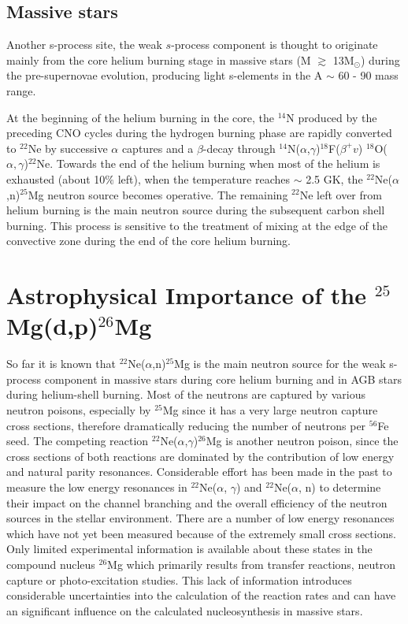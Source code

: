 \subsection{Massive stars}

Another s-process site, the weak $s$-process component is thought to originate mainly from the core helium burning stage in massive stars (M $\gtrsim$ 13M$_\odot$) during the pre-supernovae evolution, producing light s-elements in the A $\sim$ 60 - 90 mass range.

At the beginning of the helium burning in the core, the $^{14}$N produced by the preceding CNO cycles during the hydrogen burning phase are rapidly converted to $^{22}$Ne by successive $\alpha$ captures and a $\beta$-decay through  $^{14}$N($\alpha$,$\gamma$)$^{18}$F($\beta ^{+} v$) $^{18}$O($\alpha,\gamma$)$^{22}$Ne. Towards the end of the helium burning when most of the helium is exhausted (about 10$\%$ left), when the temperature reaches $\sim$ 2.5 GK, the $^{22}$Ne($\alpha$,n)$^{25}$Mg neutron source becomes operative. The remaining $^{22}$Ne left over from helium burning is the main neutron source during the subsequent carbon shell burning. This process is sensitive to the treatment of mixing at the edge of the convective zone during the end of the core helium burning.






\section{Astrophysical Importance of the $^{25}$Mg(d,p)$^{26}$Mg}


So far it is known that $^{22}$Ne($\alpha$,n)$^{25}$Mg is the main neutron source for the  weak s-process component in massive stars during core helium burning and in AGB stars during helium-shell burning. Most of the neutrons are captured by various neutron poisons, especially by $^{25}$Mg since it has a very large neutron capture cross sections, therefore dramatically reducing the number of neutrons per $^{56}$Fe seed. The competing reaction  $^{22}$Ne($\alpha$,$\gamma$)$^{26}$Mg is another neutron poison, since the cross sections of both reactions are  dominated by the contribution of low energy and natural parity resonances\citep{Kappeler2011}. Considerable effort has been made in the past to measure the low energy resonances in $^{22}$Ne($\alpha$, $\gamma$) and $^{22}$Ne($\alpha$, n) \citep{Wolke1989}\citep{Jaeger2001}to determine their impact on the channel branching and the overall efficiency of the neutron sources in the stellar environment. There are a number of low energy resonances which have not yet been measured because of the extremely small cross sections. Only limited experimental information is available about these states in the compound nucleus $^{26}$Mg which primarily results from transfer reactions, neutron capture or photo-excitation studies. This lack of information introduces considerable uncertainties into the calculation of the reaction rates and can have an significant influence on the calculated nucleosynthesis in massive stars.


